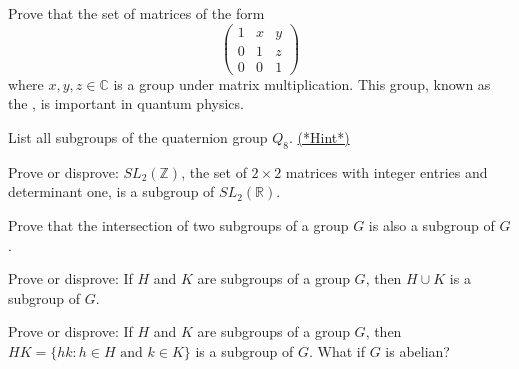   
\begin{exercise}{} 
Prove that the set of matrices of the form
\[
\begin{pmatrix}
1 & x & y \\
0 & 1 & z \\
0 & 0 & 1
\end{pmatrix}
\]
where $x,y,z \in \mathbb{C}$ is a group under matrix multiplication.  This group, known as the
, is important in
quantum physics.
\end{exercise}  
  

\begin{exercise}{}\label{ex:groups:quat}
List all subgroups of the quaternion group $Q_8$. \hyperref[sec:groups:hints]{(*Hint*)}
\end{exercise} 
 
\begin{exercise}{}
Prove or disprove: $SL_2( {\mathbb Z} )$, the set of $2 \times 2$
matrices with integer entries and determinant one, is a subgroup of
$SL_2( {\mathbb R} )$. 
\end{exercise}
 
\begin{exercise}{}\label{ex:eoc:31}
Prove that the intersection of two subgroups of a group $G$ is also a
subgroup of $G$. 
 \end{exercise}
 
\begin{exercise}{}
Prove or disprove:  If $H$ and $K$ are subgroups of a group $G$, then
$H \cup K$ is a subgroup of $G$. 
\end{exercise} 
 
\begin{exercise}{}
Prove or disprove: If $H$ and $K$ are subgroups of a group $G$, then
$H K = \{hk : h \in H \text{ and } k \in K \}$ is a subgroup of $G$.
What if $G$ is abelian? 
\end{exercise} 
 
